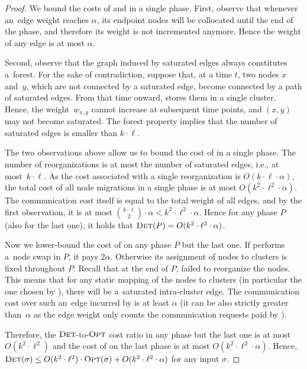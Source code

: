 \begin{proof}
We bound the costs of \DET and \OPT in a single phase. First, observe that
whenever an~edge weight reaches $\alpha$, its endpoint nodes will be collocated 
until the end of the phase, and therefore its weight is not
incremented anymore. Hence the weight of any edge is at most $\alpha$.

Second, observe that the graph induced by saturated edges always constitutes 
a~forest. For the sake of contradiction, suppose that, at a time $t$,
two nodes $x$ and~$y$, which are not
connected by a saturated edge, become connected by a path of saturated edges.
From that time onward, \DET stores them in a single cluster. Hence, the
weight~$w_{x,y}$ cannot increase at subsequent time points, and $(x,y)$ may
not become saturated. The forest property implies that the number of saturated
edges is smaller than $k \cdot \ell$.

The two observations above allow us to bound the cost of \DET in a single
phase. The number of reorganizations is at most the number of saturated edges,
i.e., at most~$k \cdot \ell$. As the cost associated with a single
reorganization is $O(k \cdot \ell \cdot \alpha)$, the total cost of all node
migrations in a single phase is at most $O(k^2 \cdot \ell^2 \cdot \alpha)$.
The communication cost itself is equal to the total weight of all edges, and
by the first observation, it is at most $\binom{k \cdot \ell}{2}
\cdot \alpha < k^2 \cdot \ell^2 \cdot \alpha$. Hence for any phase $P$ (also
for the last one), it holds that $\textsc{Det}(P) = O(k^2 \cdot \ell^2 \cdot \alpha)$.

Now we lower-bound the cost of \OPT on any phase $P$ but the last one. If \OPT
performs a~node swap in $P$, it pays $2 \alpha$. Otherwise its assignment of
nodes to clusters is fixed throughout $P$. Recall that at the end of $P$, \DET
failed to reorganize the nodes. This means that for any static mapping of the
nodes to clusters (in particular the one chosen by \OPT), there will be a~saturated intra-cluster edge. The communication cost over such an~edge incurred
by \OPT is at least $\alpha$ (it can be also strictly greater than~$\alpha$ as
the edge weight only counts the communication requests paid by \DET).

Therefore, the $\textsc{Det}$-to-$\textsc{Opt}$ cost ratio in any phase but the last one is at
most $O(k^2 \cdot \ell^2)$ and the cost of \DET on the last phase is at
most $O(k^2 \cdot \ell^2 \cdot \alpha)$. Hence,
$\textsc{Det}(\sigma) \leq O(k^2 \cdot \ell^2) \cdot \textsc{Opt}(\sigma) + O(k^2 \cdot
\ell^2 \cdot \alpha)$ for any input $\sigma$.
\end{proof}


